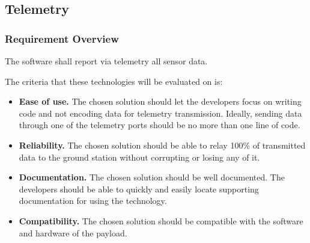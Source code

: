 \documentclass[letterpaper,10pt]{article}
\begin{document}
\subsection{Telemetry}
\subsubsection{Requirement Overview}
The software shall report via telemetry all sensor data.

The criteria that these technologies will be evaluated on is:
\begin{itemize}
\item \textbf{Ease of use.}
The chosen solution should let the developers focus on writing code and not encoding data for telemetry transmission.
Ideally, sending data through one of the telemetry ports should be no more than one line of code. 
\item \textbf{Reliability.}
The chosen solution should be able to relay 100\% of transmitted data to the ground station without corrupting or losing any of it.
\item \textbf{Documentation.}
The chosen solution should be well documented.
The developers should be able to quickly and easily locate supporting documentation for using the technology.
\item \textbf{Compatibility.}
The chosen solution should be compatible with the software and hardware of the \gls{payload}.
\end{itemize}
\end{document}
